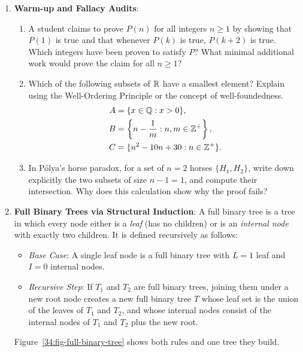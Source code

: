 \begin{enumerate}
  \item \textbf{Warm-up and Fallacy Audits}:
  \begin{enumerate}
    \item A student claims to prove $P(n)$ for all integers $n \ge 1$ by showing that $P(1)$ is true and that whenever $P(k)$ is true, $P(k+2)$ is true. Which integers have been proven to satisfy $P$? What minimal additional work would prove the claim for all $n \ge 1$?
    \item Which of the following subsets of $\mathbb{R}$ have a smallest element? Explain using the Well-Ordering Principle or the concept of well-foundedness.
    \begin{align*}
    A &= \{x \in \mathbb{Q} : x > 0\}, \\
    B &= \left\{n - \frac{1}{m} : n, m \in \mathbb{Z}^+\right\}, \\
    C &= \{n^2 - 10n + 30 : n \in \mathbb{Z}^+\}.
    \end{align*}
    \item In P\'olya's horse paradox, for a set of $n=2$ horses $\{H_1, H_2\}$, write down explicitly the two subsets of size $n-1 = 1$, and compute their intersection. Why does this calculation show why the proof fails?
  \end{enumerate}

  \item \textbf{Full Binary Trees via Structural Induction}:
  A full binary tree is a tree in which every node either is a \emph{leaf} (has no children) or is an \emph{internal node} with exactly two children. It is defined recursively as follows:
  \begin{itemize}
    \item \emph{Base Case}: A single leaf node is a full binary tree with $L=1$ leaf and $I=0$ internal nodes.
    \item \emph{Recursive Step}: If $T_1$ and $T_2$ are full binary trees, joining them under a new root node creates a new full binary tree $T$ whose leaf set is the union of the leaves of $T_1$ and $T_2$, and whose internal nodes consist of the internal nodes of $T_1$ and $T_2$ plus the new root.
  \end{itemize}
  Figure~\ref{34:fig-full-binary-tree} shows both rules and one tree they build.

  \begin{figure}[htbp]
  \centering
\end{figure}
\end{enumerate}
